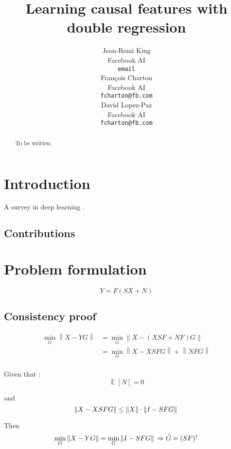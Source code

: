 \documentclass{article}
\title{Learning causal features with double regression}
\author{%
  Jean-Remi King\\
  Facebook AI\\
  \texttt{email} \\
  \And
  Fran\c{c}ois Charton\\
  Facebook AI\\
  \texttt{fcharton@fb.com}\\
  \And
  David Lopez-Paz\\
  Facebook AI\\
  \texttt{fcharton@fb.com}
}
\begin{document}
\maketitle

\begin{abstract}
    To be written.
\end{abstract}

\section{Introduction}


A survey in deep learning \citep{deep_learning_nature}.

\subsection{Contributions}

\section{Problem formulation}
\begin{equation}
    Y = F(SX + N)
    \label{eq:model}
\end{equation}

\subsection{Consistency proof}

\begin{equation}
\begin{aligned}
\min_G \left \| X-YG \right \| &= \min_G \left \| X - (XSF+NF)G\right\| \\
&{}= \min_G \left \| X - XSFG\right\|  + \left \| NFG \right \| \\
\end{aligned}
\end{equation}

Given that :
\begin{equation}
\mathop{\mathbb{E}}[N]=0
\end{equation}

and
\begin{equation}
\left \| X-XSFG \right \| \leq \left \| X \right \| \cdot  \left \| I-SFG \right \| \\
\end{equation}

Then
\begin{equation}
\min_G \left \| X-YG \right \| = \min_G \left \| I -SFG\right\| \\
\Rightarrow \hat  G= (SF)^{\dagger}
\end{equation}
\end{document}
